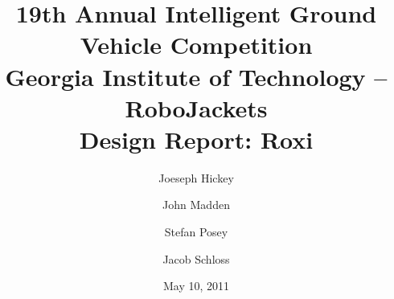 \documentclass[letterpaper,12pt]{article}
\title{19th Annual Intelligent Ground Vehicle Competition\\\large{Georgia Institute of Technology -- RoboJackets}\\\normalsize{Design Report: Roxi}}
\author{
Joeseph Hickey
\and
John Madden
\and
Stefan Posey
\and
Jacob Schloss
}
\date{May 10, 2011}
\begin{document}
\maketitle
\thispagestyle{empty}
\begin{center}
\end{center}

\newpage


\newpage
\setcounter{tocdepth}{2}
\tableofcontents

\newpage
\listoffigures
\listoftables

\newpage


\newpage


\newpage


\newpage


\newpage


\newpage


\newpage

\end{document}
